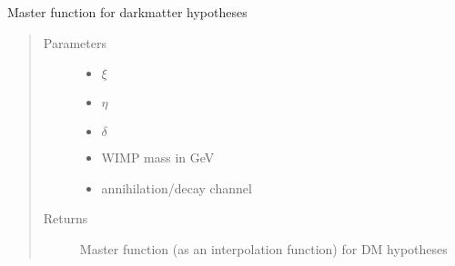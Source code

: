 \documentclass[letterpaper,10pt,english]{sphinxmanual}
\begin{document}
\begin{fulllineitems}
\label{\detokenize{diffsph.spectra:diffsph.spectra.synchrotron.Mst_DM}}
\sphinxAtStartPar
Master function for dark\sphinxhyphen{}matter hypotheses
\begin{quote}\begin{description}
\item[{Parameters}] \leavevmode\begin{itemize}
\item {} 
\sphinxAtStartPar
{} \textendash{} \(\xi\)

\item {} 
\sphinxAtStartPar
{} \textendash{} \(\eta\)

\item {} 
\sphinxAtStartPar
{} \textendash{} \(\delta\)

\item {} 
\sphinxAtStartPar
{} \textendash{} WIMP mass in GeV

\item {} 
\sphinxAtStartPar
{} \textendash{} annihilation/decay channel

\end{itemize}

\item[{Returns}] \leavevmode
\sphinxAtStartPar
Master function (as an interpolation function) for DM hypotheses

\end{description}\end{quote}

\end{fulllineitems}

\end{document}
